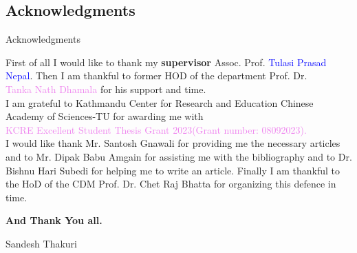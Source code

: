 \documentclass{beamer}
\begin{document}
\subsection{Acknowledgments}
\begin{frame}{Acknowledgments}

  First of all I would like to thank my \textbf{supervisor} Assoc. Prof. \textcolor{blue}{Tulasi Prasad Nepal}. Then I am thankful to former HOD of the department Prof. Dr.\\
  \textcolor{violet}{Tanka Nath Dhamala} for his support and time.\\[4mm]

I am grateful to Kathmandu Center for Research and Education Chinese Academy of Sciences-TU for awarding me with \\
\textcolor{violet}{KCRE Excellent Student Thesis Grant 2023(Grant number: 08092023).}\\[4mm]

I would like thank  Mr. \textcolor{green!50!black}{Santosh Gnawali} for providing me the necessary articles and to Mr. \textcolor{green!50!black}{Dipak Babu Amgain} for assisting me with the bibliography and to Dr. \textcolor{green!50!black}{Bishnu Hari Subedi} for helping me to write an article. Finally I am thankful to the HoD of the CDM  Prof. Dr. \textcolor{green!50!black}{Chet Raj Bhatta} for organizing this defence in time.
\\[4mm]
\begin{center}
  \large \bfseries \color{magenta}
  And Thank You all.
  \end{center}
\begin{minipage}{1\textwidth}
	\begin{flushright}
		{\color {blue} Sandesh Thakuri}\\
	\end{flushright}
      \end{minipage}
    \end{frame}
\end{document}
